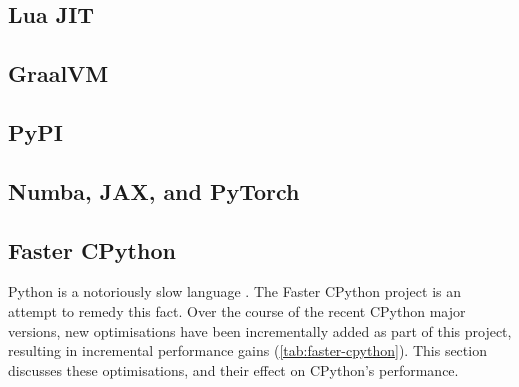 \subsection{Lua JIT}
\label{ssec:lua-jit}

\subsection{GraalVM}
\label{ssec:graalvm}

\subsection{PyPI}
\label{ssec:graalvm}

\subsection{Numba, JAX, and PyTorch}
\label{ssec:number-jax-pytorch}








\subsection{Faster CPython}
\label{ssec:faster-cpython}


Python is a notoriously slow language \cite{}. The Faster CPython project is an attempt to remedy this fact.
Over the course of the recent CPython major versions, new optimisations have been incrementally added as part of this project, resulting in incremental performance gains (\autoref{tab:faster-cpython}).
This section discusses these optimisations, and their effect on CPython's performance.

